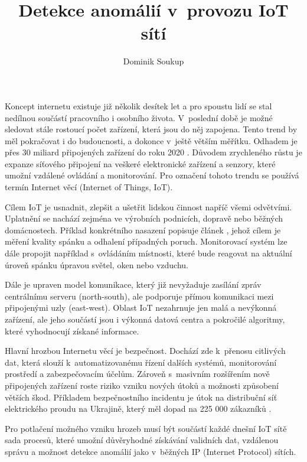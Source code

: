 \documentclass[thesis=M,czech]{FITthesis}[2012/06/26]
\title{Detekce anomálií v~provozu IoT sítí}
\author{Dominik Soukup} %
\begin{document}

\begin{introduction}
Koncept internetu existuje již několik desítek let a pro spoustu lidí se stal 
nedílnou součástí pracovního i osobního života. V~poslední době je možné sledovat
stále rostoucí počet zařízení, která jsou do něj zapojena. Tento trend by měl
pokračovat i do budoucnosti, a dokonce v~ještě větším měřítku. Odhadem je 
přes 30 miliard připojených zařízení do roku 2020 \cite{iotDevices}.
Důvodem zrychleného
růstu je expanze síťového připojení na veškeré elektronické zařízení a senzory, 
které umožní vzdálené ovládání a monitorování. Pro označení tohoto trendu se používá
termín Internet věcí (Internet of Things, IoT).

Cílem IoT je usnadnit, zlepšit a ušetřit lidskou činnost napříč všemi odvětvími. 
Uplatnění se nachází zejména ve výrobních podnicích, dopravě nebo běžných domácnostech.
Příklad konkrétního nasazení popisuje článek \cite{sleeping}, jehož cílem je měření 
kvality spánku a odhalení případných poruch. Monitorovací systém lze dále 
propojit například s~ovládáním místnosti, které bude reagovat na aktuální úroveň spánku
úpravou světel, oken nebo vzduchu.

Dále je upraven model komunikace, který již nevyžaduje zasílání zpráv centrálnímu 
serveru (north-south), ale podporuje přímou komunikaci mezi připojenými uzly (east-west).
Oblast IoT nezahrnuje jen malá a nevýkonná zařízení, ale jeho součástí jsou i 
výkonná datová centra a pokročilé algoritmy, které vyhodnocují získané informace.

Hlavní hrozbou Internetu věcí je bezpečnost. Dochází zde k~přenosu citlivých dat,
která slouží
k~automatizovanému řízení dalších
systémů, monitorování prostředí a zabezpečovacím účelům. Zároveň s~masivním rozšířením nově
připojených zařízení roste riziko vzniku nových útoků a možnosti způsobení větších
škod. Příkladem bezpečnostního incidentu je útok na distribuční síť elektrického 
proudu na Ukrajině, který měl dopad na 225 000 zákazníků \cite{ukraine}. 

Pro potlačení možného vzniku hrozeb musí být součástí každé dnešní IoT sítě sada procesů,
které umožní důvěryhodné
získávání validních dat, vzdálenou správu a možnost
detekce anomálií jako v~běžných IP (Internet Protocol) sítích. 	
\end{introduction}
\end{document}
